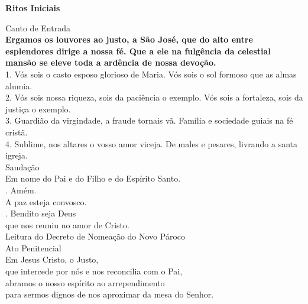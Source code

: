 \documentclass{book}
\begin{document}

\newpage
\begin{center}
    \textbf{Ritos Iniciais}
\end{center}
\begin{flushleft}
    \textcolor{VioletRed2}{Canto de Entrada}
    \vspace{.2cm} \\
    \textbf{Ergamos os louvores ao justo, a São José, que do alto entre esplendores dirige a nossa fé. Que a ele na fulgência da celestial mansão se eleve toda a ardência de nossa devoção.}
    \vspace{.2cm} \\
    1. Vós sois o casto esposo glorioso de Maria. Vós sois o sol formoso que as almas alumia. \\
    2. Vós sois nossa riqueza, sois da paciência o exemplo. Vós sois a fortaleza, sois da justiça o exemplo. \\
    3. Guardião da virgindade, a fraude tornais vã. Família e sociedade guiais na fé cristã. \\
    4. Sublime, nos altares o vosso amor viceja. De males e pesares, livrando a santa igreja.
    \vspace{.2cm} \\
    \textcolor{VioletRed2}{Saudação}
    \vspace{.2cm}\\
    Em nome do Pai e do Filho e do Espírito Santo. \\
    {\color{VioletRed2} \Rbar.} Amém. \\
    A paz esteja convosco. \\
    {\color{VioletRed2} \Rbar.} Bendito seja Deus \\
    que nos reuniu no amor de Cristo.
    \vspace{.2cm} \\
    \textcolor{VioletRed2}{Leitura do Decreto de Nomeação do Novo Pároco}
    \vspace{.2cm} \\
    \textcolor{VioletRed2}{Ato Penitencial}
    \vspace{.2cm} \\
    Em Jesus Cristo, o Justo, \\
    que intercede por nós e nos reconcilia com o Pai, \\
    abramos o nosso espírito ao arrependimento \\
    para sermos dignos de nos aproximar da mesa do Senhor.
    \vspace{.2cm} \\

\end{flushleft}
\end{document}
